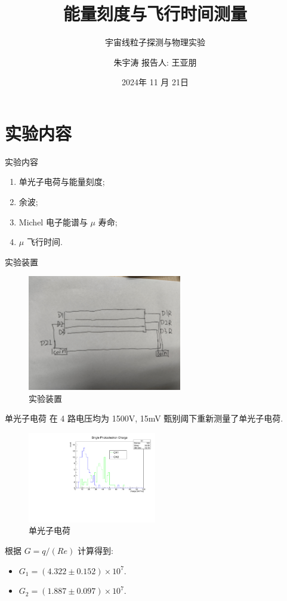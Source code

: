 \documentclass[10pt]{beamer}
\author{朱宇涛 \quad 报告人: 王亚朋}
\date{2024年 11 月 21日}
\title{能量刻度与飞行时间测量}
\subtitle{宇宙线粒子探测与物理实验}
\begin{document}
\maketitle
\section{实验内容}
\label{sec:orgb85fb84}
\begin{frame}[label={sec:org39214a7}]{实验内容}
\begin{enumerate}
\item 单光子电荷与能量刻度;
\item 余波;
\item Michel 电子能谱与 \(\mu\) 寿命;
\item \(\mu\) 飞行时间.
\end{enumerate}
\end{frame}
\begin{frame}[label={sec:org2231b0d}]{实验装置}
\begin{figure}[htbp]
\centering
\includegraphics[width=0.6\textwidth]{../../img/instru.jpg}
\caption{实验装置}
\end{figure}
\end{frame}

\begin{frame}[label={sec:org1151998}]{单光子电荷}
在 4 路电压均为 1500V, 15mV 甄别阈下重新测量了单光子电荷.
\begin{figure}[htbp]
\centering
\includegraphics[width=0.5\textwidth]{../../DetectorPerform/SPhoton/SphotonCharge.pdf}
\caption{单光子电荷}
\end{figure}
根据 \(G = q/(Re)\) 计算得到:
\begin{itemize}
\item \(G_1 = (4.322 \pm 0.152) \times 10^7\).
\item \(G_2 = (1.887 \pm 0.097) \times 10^7\).
\end{itemize}
\end{frame}
\end{document}
